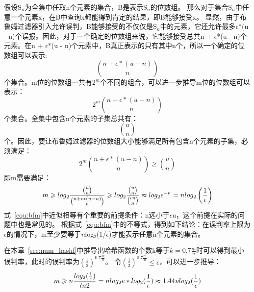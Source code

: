 假设S$_n$为全集中任取n个元素的集合，B是表示S$_n$的位数组。
那么对于集合S$_n$中任意一个元素x，在B中查询x都能得到肯定的结果，即B能够接受x。
显然，由于布鲁姆过滤器引入允许误判，B能够接受的不仅仅是S$_n$中的元素，它还允许最多\begin{math}\epsilon\end{math}*(u - n)个误报。因此，对于一个确定的位数组来说，它能够接受总共n + \begin{math}\epsilon\end{math}*(u - n)个元素。在n + \begin{math}\epsilon\end{math}*(u - n)个元素中，B真正表示的只有其中n个，所以一个确定的位数组可以表示:
\begin{equation}
\binom{n + \epsilon *\left(u - n\right)}{n}
\end{equation}
个集合。m位的位数组一共有2$^m$个不同的组合，可以进一步推导m位的位数组可以表示：
\begin{equation}
2^m\binom{n + \epsilon *\left(u - n\right)}{n}
\end{equation}
个集合。全集中包含n个元素的子集总共有：
\begin{equation}
\binom{u}{n}
\end{equation}
个。因此，要让布鲁姆过滤器的位数组大小能够满足所有包含n个元素的子集，必须满足：
\begin{equation}
2^m\binom{n + \epsilon *\left(u - n\right)}{n} \geq \binom{u}{n}
\end{equation}
即m需要满足：
\begin{equation}
m \geq log_2\frac{\binom{u}{n}}{\binom{n + \epsilon *\left(u - n\right)}{n}} \geq log_2\frac{\binom{u}{n}}{\binom{\epsilon u}{n}} \thickapprox log_2\epsilon^{-n} = n log_2\left(\frac{1}{\epsilon}\right)
\label{equ:bfm}
\end{equation}
式~\ref{equ:bfm}中近似相等有个重要的前提条件：n远小于\begin{math}\epsilon\end{math}u，这个前提在实际的问题中也是常见的。
根据式~\ref{equ:bfm}中的不等式，得到如下结论：在误判率上限为\begin{math}\epsilon\end{math}的情况下，m至少要等于\textit{n}log$_2$(1/\begin{math}\epsilon\end{math})才能表示任意n个元素的集合。

在本章~\ref{sec:num_hashf}中推导出哈希函数的个数k等于\begin{math}k = 0.7\frac{m}{n}\end{math}时可以得到最小误判率，此时的误判率为\begin{math}(\frac{1}{2})^{0.7\frac{m}{n}}\end{math}。
令\begin{math}(\frac{1}{2})^{0.7\frac{m}{n}} \leq \epsilon \end{math}，可以进一步推导：
\begin{equation}
m \geq n\frac{log_2(\frac{1}{\epsilon})}{ln2} = nlog_2e\ast log_2(\frac{1}{\epsilon}) \thickapprox 1.44\textit{n}log_2(\frac{1}{\epsilon})
\label{equ:bfm2}
\end{equation}

